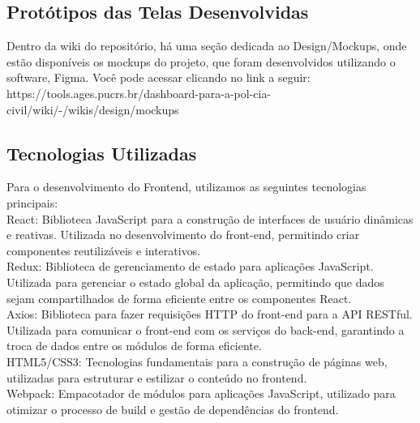 \subsection{Protótipos das Telas Desenvolvidas}
Dentro da wiki do repositório, há uma seção dedicada ao Design/Mockups, onde estão disponíveis os mockups do projeto, que foram desenvolvidos utilizando o software, Figma. Você pode acessar clicando no link a seguir: https://tools.ages.pucrs.br/dashboard-para-a-pol-cia-civil/wiki/-/wikis/design/mockups


\subsection{Tecnologias Utilizadas}
Para o desenvolvimento do Frontend, utilizamos as seguintes tecnologias principais:\\
React: Biblioteca JavaScript para a construção de interfaces de usuário dinâmicas e reativas. Utilizada no desenvolvimento do front-end, permitindo criar componentes reutilizáveis e interativos.\\
Redux: Biblioteca de gerenciamento de estado para aplicações JavaScript. Utilizada para gerenciar o estado global da aplicação, permitindo que dados sejam compartilhados de forma eficiente entre os componentes React.\\
Axios: Biblioteca para fazer requisições HTTP do front-end para a API RESTful. Utilizada para comunicar o front-end com os serviços do back-end, garantindo a troca de dados entre os módulos de forma eficiente.\\
HTML5/CSS3: Tecnologias fundamentais para a construção de páginas web, utilizadas para estruturar e estilizar o conteúdo no frontend.\\
Webpack: Empacotador de módulos para aplicações JavaScript, utilizado para otimizar o processo de build e gestão de dependências do frontend.\\

